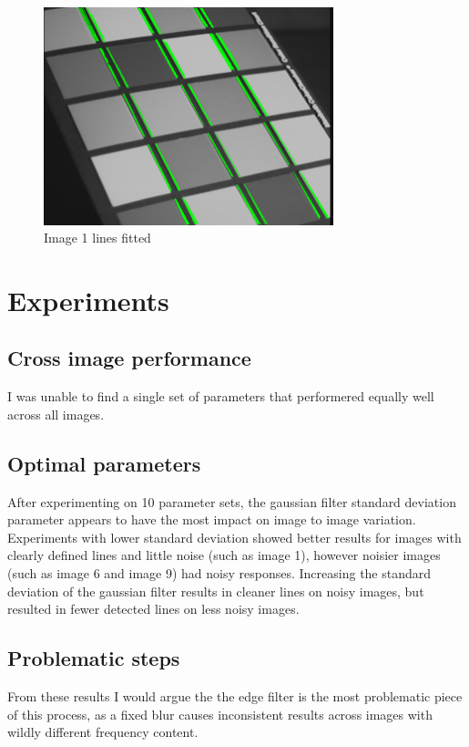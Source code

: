 \documentclass[12pt]{article}
\begin{document}
\begin{figure}[H] \centering \includegraphics[page=1,width=0.75\textwidth]{img01_04lines}
\caption{Image 1 lines fitted}    \end{figure}   


\newpage
\section{Experiments}
\subsection{Cross image performance}
I was unable to find a single set of parameters that performered equally well across all images.

\newpage
\subsection{Optimal parameters}
After experimenting on 10 parameter sets, the gaussian filter standard deviation parameter appears to have the most impact on image to image variation. Experiments with lower standard deviation showed better results for images with clearly defined lines and little noise (such as image 1), however noisier images (such as image 6 and image 9) had noisy responses.
Increasing the standard deviation of the gaussian filter results in cleaner lines on noisy images, but resulted in fewer detected lines on less noisy images.

\newpage
\subsection{Problematic steps}
From these results I would argue the the edge filter is the most problematic piece of this process, as a fixed blur causes inconsistent results across images with wildly different frequency content.
\end{document}
